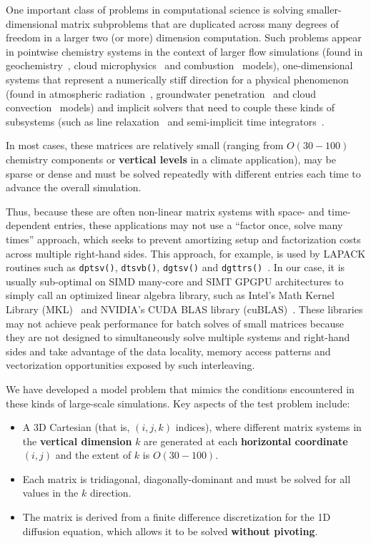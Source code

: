 \documentclass{sig-alternate}
\begin{document}
One important class of problems in computational science is solving
  smaller-dimensional matrix subproblems that are duplicated across
  many degrees of freedom in a larger two (or more) dimension computation.
Such problems appear in
  pointwise chemistry systems in the context of larger 
    flow simulations (found in geochemistry~\cite{pflotran}, cloud
    microphysics~\cite{climate_mg2} and combustion~\cite{combustion_pazner}
    models),
  one-dimensional systems that represent a numerically stiff
    direction for a physical phenomenon (found in atmospheric
    radiation~\cite{climate_rrtmg}, groundwater
    penetration~\cite{pflotran_groundwater} and cloud
    convection~\cite{climate_sam} models) and
  implicit solvers that need to couple these kinds of subsystems
    (such as line relaxation~\cite{multigrid_trottenberg} and 
    semi-implicit time integrators~\cite{imex}.

In most cases, these matrices are relatively small 
  (ranging from \(O(30-100)\) chemistry components or \textbf{vertical levels}
  in a climate application), may be sparse or dense and must be solved
  repeatedly with different entries each time to advance the overall simulation.

Thus, because these are often non-linear matrix systems with space- and 
  time-dependent entries, these applications may not use a 
  ``factor once, solve many times'' approach, which seeks to prevent amortizing
  setup and factorization costs across multiple right-hand sides.
This approach, for example, is used by 
  LAPACK routines such as \lstinline{dptsv()}, \lstinline{dtsvb()},
  \lstinline{dgtsv()} and
  \lstinline{dgttrs()}~\cite{mkl_ref_driver_routines}.
In our case, it is usually sub-optimal on SIMD many-core and SIMT GPGPU
  architectures to simply call an optimized linear algebra library, 
  such as Intel's Math Kernel Library (MKL)~\cite{mkl} and NVIDIA's
  CUDA BLAS library (cuBLAS)~\cite{cublas}.
These libraries may not achieve peak performance for batch solves of small
  matrices because they are not designed to simultaneously solve multiple systems
  and right-hand sides and take advantage of the data locality, memory
  access patterns and vectorization opportunities exposed by such interleaving. 
  
We have developed a model problem that mimics the conditions encountered in
  these kinds of large-scale simulations. 
Key aspects of the test problem include:
\begin{itemize}
\item A 3D Cartesian (that is, \((i,j,k)\) indices), where different matrix
  systems in the \textbf{vertical dimension} \(k\) are generated at each
  \textbf{horizontal coordinate} \((i,j)\) and the extent of \(k\) is
  \(O(30-100)\).
\item Each matrix is tridiagonal, diagonally-dominant and must be solved for
  all values in the \(k\) direction.
\item The matrix is derived from a finite difference discretization for the
  1D diffusion equation, which allows it to be solved \textbf{without pivoting}.
\end{itemize}
\end{document}
